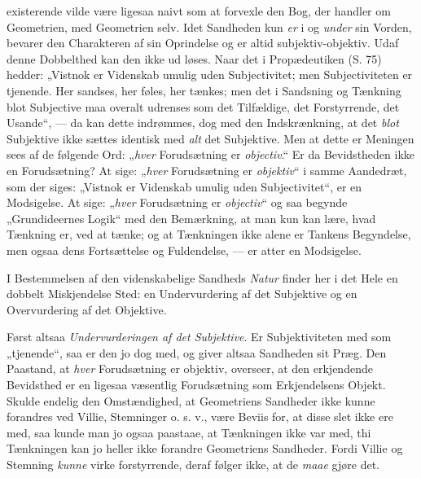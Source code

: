 \documentclass[12pt,a4paper]{book}
\newcommand{\opage}[1]{\marginnote{\footnotesize\textit{[#1]}}}
\begin{document}
existerende vilde være ligesaa naivt som at forvexle den
Bog, der handler om Geometrien, med Geometrien selv.
Idet Sandheden kun \emph{er} i og \emph{under} sin Vorden, bevarer
den Charakteren af sin Oprindelse og er altid subjektiv-objektiv.
Udaf denne Dobbelthed kan den ikke ud%
\opage{24}\setcounter{footnote}{0}løses. Naar det i Propædeutiken (S. 75) hedder: „Vistnok
er Videnskab umulig uden Subjectivitet; men Subjectiviteten
er tjenende. Her sandses, her føles, her tænkes;
men det i Sandsning og Tænkning blot Subjective maa
overalt udrenses som det Tilfældige, det Forstyrrende, det
Usande“, --- da kan dette indrømmes, dog med den
Indskrænkning, at det \emph{blot} Subjektive ikke sættes identisk
med \emph{alt} det Subjektive. Men at dette er Meningen
sees af de følgende Ord: „\emph{hver} Forudsætning er \emph{objectiv}.“
Er da Bevidstheden ikke en Forudsætning? At
sige: „\emph{hver} Forudsætning er \emph{objektiv}“ i samme Aandedræt,
som der siges: „Vistnok er Videnskab umulig uden
Subjectivitet“, er en Modsigelse. At sige: „\emph{hver} Forudsætning
er \emph{objectiv}“ og saa begynde „Grundideernes
Logik“ med den Bemærkning, at man kun kan lære, hvad
Tænkning er, ved at tænke; og at Tænkningen ikke alene
er Tankens Begyndelse, men ogsaa dens Fortsættelse og
Fuldendelse, --- er atter en Modsigelse.

I Bestemmelsen af den videnskabelige Sandheds
\emph{Natur} finder her i det Hele en dobbelt Miskjendelse
Sted: en Undervurdering af det Subjektive og en Overvurdering
af det Objektive.

Først altsaa \emph{Undervurderingen af det Subjektive}.
Er Subjektiviteten med som „tjenende“, saa
er den jo dog med, og giver altsaa Sandheden sit
Præg. Den Paastand, at \emph{hver} Forudsætning er
objektiv, overseer, at den erkjendende Bevidsthed er
en ligesaa væsentlig Forudsætning som Erkjendelsens
Objekt. Skulde endelig den Omstændighed, at Geometriens
Sandheder ikke kunne forandres ved Villie,
Stemninger o. s. v., være Beviis for, at disse slet ikke
\opage{25}\setcounter{footnote}{0}%
ere med, saa kunde man jo ogsaa paastaae, at Tænkningen
ikke var med, thi Tænkningen kan jo heller ikke
forandre Geometriens Sandheder. Fordi Villie og
Stemning \emph{kunne} virke forstyrrende, deraf følger ikke, at
de \emph{maae} gjøre det.
\end{document}
